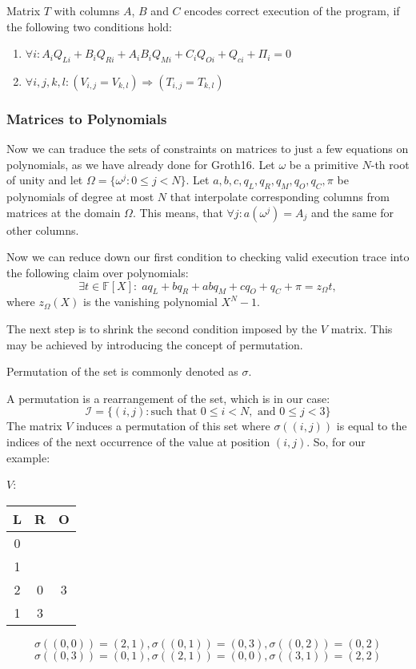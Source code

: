 \documentclass[../lecture-notes.tex]{subfiles}
\begin{document}
\begin{definition}
Matrix $T$ with columns $A$, $B$ and $C$ encodes correct execution of the program, if the following two conditions hold:
\begin{enumerate}
    \item \(\forall i: A_i Q_{Li} + B_i Q_{Ri} + A_i B_i Q_{Mi} + C_i Q_{Oi} + Q_{ci} + \Pi_i = 0\)
    \item \(\forall i, j, k, l: (V_{i,j} = V_{k,l}) \Rightarrow (T_{i,j} = T_{k,l})\)
\end{enumerate}
\end{definition}

\subsubsection{Matrices to Polynomials}

Now we can traduce the sets of constraints on matrices to just a few equations
on polynomials, as we have already done for Groth16. Let $\omega$ be a primitive
$N$-th root of unity and let $\Omega = \{\omega^j: 0 \le j < N\}$. Let \(a, b, c,
q_L, q_R, q_M, q_O, q_C, \pi\) be polynomials of degree at most $N$ that
interpolate corresponding columns from matrices at the domain $\Omega$. This means,
that \(\forall j: a(\omega^j) = A_j\) and the same for other columns.

Now we can reduce down our first condition to checking valid execution trace
into the following claim over polynomials:
\[\exists t \in \mathbb{F}[X]: \; aq_L + bq_R + abq_M + cq_O + q_C + \pi = z_{\Omega} t,\]
where $z_{\Omega}(X)$ is the vanishing polynomial $X^N - 1$.

The next step is to shrink the second condition imposed by the $V$ matrix. This
may be achieved by introducing the concept of permutation. 

\begin{remark}
Permutation of the set is commonly denoted as $\sigma$.
\end{remark}

\begin{example}
A permutation is a rearrangement of the set, which is in our case: 
\[\mathcal{I} = \{(i, j) : \text{such that } 0 \leq i < N, \text{ and } 0 \leq j < 3\}\]
The matrix $V$ induces a permutation of this set where $\sigma((i,j))$ is equal to the indices of the next occurrence of the value at position $(i,j)$. So, for our example:

\begin{center}
\quad $V$:
\begin{tabular}{|c|c|c|}
\hline
L & R & O \\
\hline
0 &  &  \\
\hline
1 &  &  \\
\hline
2 & 0 & 3 \\
\hline
1 & 3 &  \\
\hline
\end{tabular}
\end{center}

\[\sigma((0,0)) = (2,1), \sigma((0,1)) = (0,3), \sigma((0,2)) = (0,2)\]
\[\sigma((0,3)) = (0,1), \sigma((2,1)) = (0,0), \sigma((3,1)) = (2,2)\]
\end{example}
\end{document}
